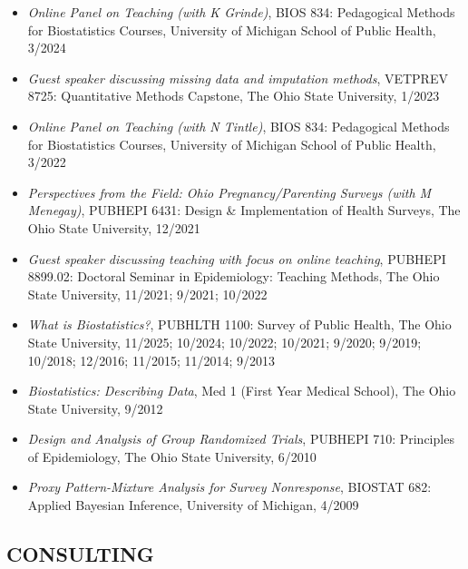 \documentclass[
  english,
  letterpaper,
  DIV=11,
  numbers=noendperiod]{scrartcl}
\providecommand{\tightlist}{%
  \setlength{\itemsep}{0pt}\setlength{\parskip}{0pt}}
\begin{document}
\begin{itemize}
\tightlist
\item
  \emph{Online Panel on Teaching (with K Grinde)}, BIOS 834: Pedagogical
  Methods for Biostatistics Courses, University of Michigan School of
  Public Health, 3/2024
\item
  \emph{Guest speaker discussing missing data and imputation methods},
  VETPREV 8725: Quantitative Methods Capstone, The Ohio State
  University, 1/2023
\item
  \emph{Online Panel on Teaching (with N Tintle)}, BIOS 834: Pedagogical
  Methods for Biostatistics Courses, University of Michigan School of
  Public Health, 3/2022
\item
  \emph{Perspectives from the Field: Ohio Pregnancy/Parenting Surveys
  (with M Menegay)}, PUBHEPI 6431: Design \& Implementation of Health
  Surveys, The Ohio State University, 12/2021
\item
  \emph{Guest speaker discussing teaching with focus on online
  teaching}, PUBHEPI 8899.02: Doctoral Seminar in Epidemiology: Teaching
  Methods, The Ohio State University, 11/2021; 9/2021; 10/2022
\item
  \emph{What is Biostatistics?}, PUBHLTH 1100: Survey of Public Health,
  The Ohio State University, 11/2025; 10/2024; 10/2022; 10/2021; 9/2020;
  9/2019; 10/2018; 12/2016; 11/2015; 11/2014; 9/2013
\item
  \emph{Biostatistics: Describing Data}, Med 1 (First Year Medical
  School), The Ohio State University, 9/2012
\item
  \emph{Design and Analysis of Group Randomized Trials}, PUBHEPI 710:
  Principles of Epidemiology, The Ohio State University, 6/2010
\item
  \emph{Proxy Pattern-Mixture Analysis for Survey Nonresponse}, BIOSTAT
  682: Applied Bayesian Inference, University of Michigan, 4/2009
\end{itemize}

\subsection{CONSULTING}\label{consulting}
\end{document}

